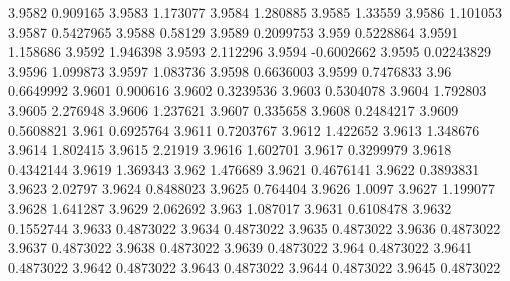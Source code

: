 3.9582  0.909165
3.9583  1.173077
3.9584  1.280885
3.9585  1.33559
3.9586  1.101053
3.9587  0.5427965
3.9588  0.58129
3.9589  0.2099753
3.959  0.5228864
3.9591  1.158686
3.9592  1.946398
3.9593  2.112296
3.9594  -0.6002662
3.9595  0.02243829
3.9596  1.099873
3.9597  1.083736
3.9598  0.6636003
3.9599  0.7476833
3.96  0.6649992
3.9601  0.900616
3.9602  0.3239536
3.9603  0.5304078
3.9604  1.792803
3.9605  2.276948
3.9606  1.237621
3.9607  0.335658
3.9608  0.2484217
3.9609  0.5608821
3.961  0.6925764
3.9611  0.7203767
3.9612  1.422652
3.9613  1.348676
3.9614  1.802415
3.9615  2.21919
3.9616  1.602701
3.9617  0.3299979
3.9618  0.4342144
3.9619  1.369343
3.962  1.476689
3.9621  0.4676141
3.9622  0.3893831
3.9623  2.02797
3.9624  0.8488023
3.9625  0.764404
3.9626  1.0097
3.9627  1.199077
3.9628  1.641287
3.9629  2.062692
3.963  1.087017
3.9631  0.6108478
3.9632  0.1552744
3.9633  0.4873022
3.9634  0.4873022
3.9635  0.4873022
3.9636  0.4873022
3.9637  0.4873022
3.9638  0.4873022
3.9639  0.4873022
3.964  0.4873022
3.9641  0.4873022
3.9642  0.4873022
3.9643  0.4873022
3.9644  0.4873022
3.9645  0.4873022
